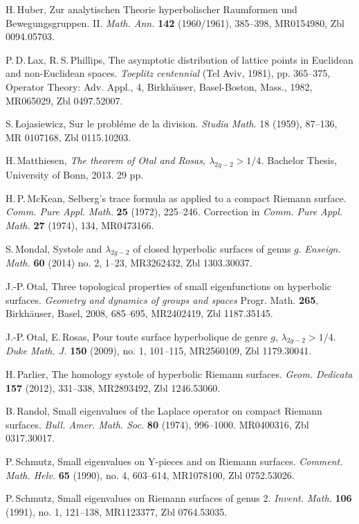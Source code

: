 \documentclass[a4paper,11pt]{amsart}
\numberwithin{equation}{section}
\theoremstyle{definition}
\begin{document}
\begin{thebibliography}{HMZ2}
H.\,Huber,
Zur analytischen Theorie hyperbolischer Raumformen und Bewegungsgruppen. II.
\emph{Math. Ann.} {\bf 142} (1960/1961), 385--398,
MR0154980, Zbl 0094.05703.
 
P.\,D.\,Lax, R.\,S.\,Phillips,
The asymptotic distribution of lattice points in Euclidean and non-Euclidean spaces.
\emph{Toeplitz centennial} (Tel Aviv, 1981), pp. 365--375,
Operator Theory: Adv. Appl., 4, Birkh\"auser, Basel-Boston, Mass., 1982,
MR065029, Zbl 0497.52007.

S.\,\L{}ojasiewicz, 
Sur le probl\'{e}me de la division.
\emph{Studia Math.} 18 (1959), 87--136,
MR 0107168, Zbl 0115.10203.

H.\,Matthiesen,
\emph{The theorem of Otal and Rosas, $\lambda_{2g-2}>1/4$.}
Bachelor Thesis, University of Bonn, 2013. 29 pp.

H.\,P.\,McKean,
Selberg's trace formula as applied to a compact Riemann surface.
\emph{Comm. Pure Appl. Math.} {\bf 25} (1972), 225--246.
Correction in \emph{Comm. Pure Appl. Math.} {\bf 27} (1974), 134,
MR0473166. 

S.\,Mondal,
Systole and $\lambda_{2g-2}$ of closed hyperbolic surfaces of genus $g$.
\emph{Enseign. Math.} {\bf 60} (2014) no. 2, 1--23,
MR3262432, Zbl 1303.30037.  

J.-P.\,Otal,
Three topological properties of small eigenfunctions on hyperbolic surfaces.
\emph{Geometry and dynamics of groups and spaces} 
Progr. Math. {\bf 265}, Birkh\"auser, Basel, 2008, 685--695,
MR2402419, Zbl 1187.35145.

J.-P.\,Otal, E.\,Rosas,
Pour toute surface hyperbolique de genre $g$, $\lambda_{2g-2}>1/4$.
\emph{Duke Math. J.} {\bf 150} (2009), no. 1, 101--115,
MR2560109, Zbl 1179.30041.

H.\,Parlier,
The homology systole of hyperbolic Riemann surfaces.
\emph{Geom. Dedicata} {\bf 157} (2012), 331--338,
MR2893492, Zbl 1246.53060. 
 
B.\,Randol,
Small eigenvalues of the Laplace operator on compact Riemann surfaces.
\emph{Bull. Amer. Math. Soc.} {\bf 80} (1974), 996--1000.
MR0400316, Zbl 0317.30017. 

P.\,Schmutz,
Small eigenvalues on Y-pieces and on Riemann surfaces.
\emph{Comment. Math. Helv.} {\bf 65} (1990), no. 4, 603--614, MR1078100, Zbl 0752.53026.

P.\,Schmutz,
Small eigenvalues on Riemann surfaces of genus 2.
\emph{Invent. Math.} {\bf 106} (1991), no. 1, 121--138,
MR1123377, Zbl 0764.53035.
 

\end{thebibliography}
\end{document}
